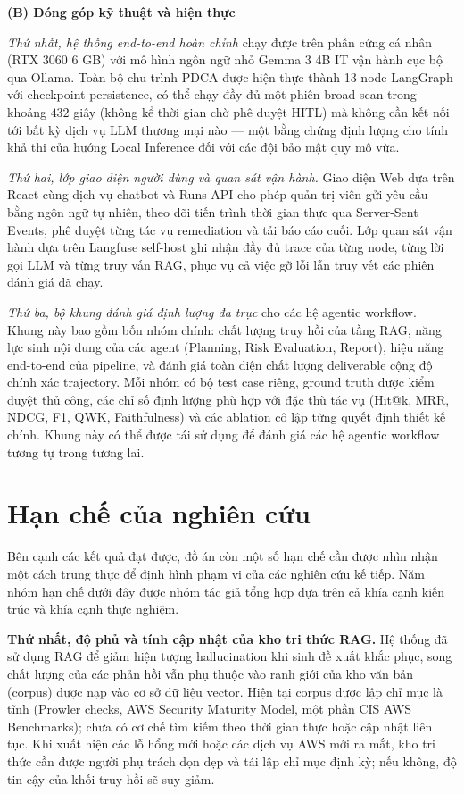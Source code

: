 \medskip
\noindent\textbf{(B) Đóng góp kỹ thuật và hiện thực}
\medskip

\textit{Thứ nhất, hệ thống end-to-end hoàn chỉnh} chạy được trên phần cứng cá nhân (RTX 3060 6 GB) với mô hình ngôn ngữ nhỏ Gemma 3 4B IT vận hành cục bộ qua Ollama. Toàn bộ chu trình PDCA được hiện thực thành 13 node LangGraph với checkpoint persistence, có thể chạy đầy đủ một phiên broad-scan trong khoảng $432$ giây (không kể thời gian chờ phê duyệt HITL) mà không cần kết nối tới bất kỳ dịch vụ LLM thương mại nào --- một bằng chứng định lượng cho tính khả thi của hướng Local Inference đối với các đội bảo mật quy mô vừa.

\textit{Thứ hai, lớp giao diện người dùng và quan sát vận hành.} Giao diện Web dựa trên React cùng dịch vụ chatbot và Runs API cho phép quản trị viên gửi yêu cầu bằng ngôn ngữ tự nhiên, theo dõi tiến trình thời gian thực qua Server-Sent Events, phê duyệt từng tác vụ remediation và tải báo cáo cuối. Lớp quan sát vận hành dựa trên Langfuse self-host ghi nhận đầy đủ trace của từng node, từng lời gọi LLM và từng truy vấn RAG, phục vụ cả việc gỡ lỗi lẫn truy vết các phiên đánh giá đã chạy.

\textit{Thứ ba, bộ khung đánh giá định lượng đa trục} cho các hệ agentic workflow. Khung này bao gồm bốn nhóm chính: chất lượng truy hồi của tầng RAG, năng lực sinh nội dung của các agent (Planning, Risk Evaluation, Report), hiệu năng end-to-end của pipeline, và đánh giá toàn diện chất lượng deliverable cộng độ chính xác trajectory. Mỗi nhóm có bộ test case riêng, ground truth được kiểm duyệt thủ công, các chỉ số định lượng phù hợp với đặc thù tác vụ (Hit@k, MRR, NDCG, F1, QWK, Faithfulness) và các ablation cô lập từng quyết định thiết kế chính. Khung này có thể được tái sử dụng để đánh giá các hệ agentic workflow tương tự trong tương lai.

\section{Hạn chế của nghiên cứu}
\label{sec:limitations}

Bên cạnh các kết quả đạt được, đồ án còn một số hạn chế cần được nhìn nhận một cách trung thực để định hình phạm vi của các nghiên cứu kế tiếp. Năm nhóm hạn chế dưới đây được nhóm tác giả tổng hợp dựa trên cả khía cạnh kiến trúc và khía cạnh thực nghiệm.

\textbf{Thứ nhất, độ phủ và tính cập nhật của kho tri thức RAG.}
Hệ thống đã sử dụng RAG để giảm hiện tượng hallucination khi sinh đề xuất khắc phục, song chất lượng của các phản hồi vẫn phụ thuộc vào ranh giới của kho văn bản (corpus) được nạp vào cơ sở dữ liệu vector. Hiện tại corpus được lập chỉ mục là tĩnh (Prowler checks, AWS Security Maturity Model, một phần CIS AWS Benchmarks); chưa có cơ chế tìm kiếm theo thời gian thực hoặc cập nhật liên tục. Khi xuất hiện các lỗ hổng mới hoặc các dịch vụ AWS mới ra mắt, kho tri thức cần được người phụ trách dọn dẹp và tái lập chỉ mục định kỳ; nếu không, độ tin cậy của khối truy hồi sẽ suy giảm.

